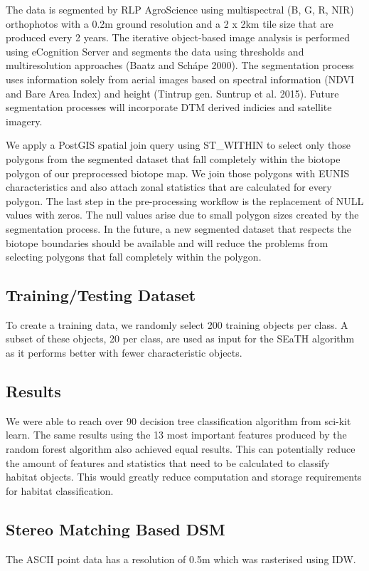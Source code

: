 \documentclass[authoryear, review,12pt,number]{elsarticle}
\begin{document}
The data is segmented by RLP AgroScience using
multispectral (B, G, R, NIR) orthophotos with a 0.2m ground resolution and a
2 x 2km tile size that are produced every 2 years. The iterative object-based
image analysis is performed using eCognition Server and segments
the data using thresholds and multiresolution approaches (Baatz and
Sch\'ape 2000). The segmentation process uses information solely from aerial
images based on spectral information (NDVI and Bare Area Index) and height
(Tintrup gen. Suntrup et al. 2015). Future segmentation processes will
incorporate DTM derived indicies and satellite imagery.

We apply a PostGIS spatial join query using ST_WITHIN to select only those
polygons from the segmented dataset that fall completely within the biotope polygon of our preprocessed
biotope map. We join those polygons
with EUNIS characteristics and also attach zonal statistics that are calculated
for every polygon. The last step in the pre-processing workflow is the
replacement of NULL values with zeros. The null values arise due to small
polygon sizes created by the segmentation process. In the future, a new
segmented dataset that respects the biotope boundaries should be available and
will reduce the problems from selecting polygons that fall completely within the
polygon.


\subsection{Training/Testing Dataset}
To create a training data, we randomly select 200 training objects per class. A
subset of these objects, 20 per class, are used as input for the SEaTH
algorithm as it performs better with fewer characteristic objects.


\subsection{Results}

We were able to reach over 90%
decision tree classification algorithm from sci-kit learn. The same results
using the 13 most important features produced by the random forest algorithm
also achieved equal results. This can potentially reduce the amount of features
and statistics that need to be calculated to classify habitat objects. This
would greatly reduce computation and storage requirements for habitat
classification.

\subsection{Stereo Matching Based DSM}
The ASCII point data has a resolution of 0.5m which was rasterised using IDW.
\end{document}
